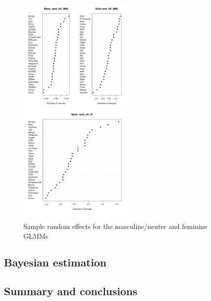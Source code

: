 \documentclass[USenglish]{article}
\begin{document}
\begin{figure}[h]
\centering
\includegraphics[width=0.5\textwidth]{figures/corpus/04_glmm_raneff_mn}~\hspace{0.05\textwidth}~\includegraphics[width=0.5\textwidth]{figures/corpus/04_glmm_raneff_fem}
\caption{Sample random effects for the masculine\slash neuter and feminine GLMMs}
\label{fig:glmm:fixef:minus1pos}
\end{figure}



\subsection{Bayesian estimation}
\label{sec:bayesian}



\subsection{Summary and conclusions}
\label{sec:modelssummary}
\end{document}
